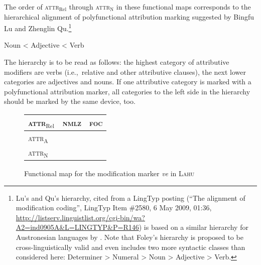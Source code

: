 The order of \textsc{attr}$_{\text{Rel}}$ through \textsc{attr}$_{\text{N}}$ in these functional maps corresponds to the hierarchical alignment of polyfunctional attribution marking suggested by Bingfu Lu and Zhenglin Qu.\footnote{Lu's and Qu's hierarchy, cited from a LingTyp posting (“The alignment of modification coding”, LingTyp Item \#2580, 6 May 2009, 01:36, \url{http://listserv.linguistlist.org/cgi-bin/wa?A2=ind0905A&L=LINGTYP&P=R146}) is based on a similar hierarchy for Austronesian languages by \textcite{foley1980}. Note that Foley's hierarchy is proposed to be cross-linguistically valid and even includes two more syntactic classes than considered here: Determiner > Numeral > Noun > Adjective > Verb.}
\begin{exe}
\ex	Noun < Adjective < Verb
\end{exe}
The hierarchy is to be read as follows: the highest category of attributive modifiers are verbs (i.e.,~relative and other attributive clauses), the next lower categories are adjectives and nouns. If one attributive category is marked with a polyfunctional attribution marker, all categories to the left side in the hierarchy should be marked by the same device, too.

\begin{figure}
\parbox[b]{\textwidth}{
\begin{center}
\begin{tabular}{| l || c | c |}
\cline{1-1}
\\
\hline
\textsc{attr}$_{\text{Rel}}$ & \textsc{nmlz} & \textsc{foc}\\
\hline
\textsc{attr}$_{\text{A}}$\\
\cline{1-1}
\textsc{attr}$_{\text{N}}$\\
\cline{1-1}
\end{tabular}
\end{center}
}
\caption[Functional map for modification marking]{Functional map for the modification marker \textit{ve} in \textsc{Lahu}}
\label{lahu funcmap}
\end{figure}

